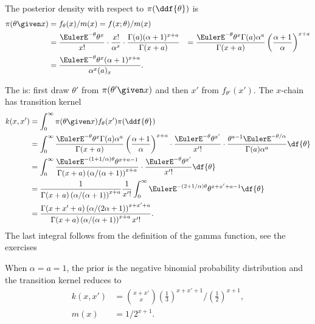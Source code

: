 \documentclass[12pt]{article}
\begin{document}
The posterior density with respect to \( \pi(\ddf{\theta}) \) is
\begin{align*}
    \pi(\theta \given x) &= f_{\theta}(x)/m(x) = f(x; \theta)/m(x)\\
    &= \frac{\EulerE^{-\theta} \theta^x}{x!} \cdot \frac{x!}{\alpha^x}
    \cdot \frac{\Gamma(a) (\alpha + 1)^{x+a}}{\Gamma(x+a)} &= \frac{\EulerE^
    {-\theta} \theta^x \Gamma(a) \alpha^{a}}{\Gamma(x+a)} \left( \frac{\alpha
    + 1}{\alpha} \right)^{x+a} \\
    &=\frac {\EulerE^{-\theta} \theta^x (\alpha+1)^{x+a}}{\alpha^x (a)_x}.
\end{align*}

The  is:  first draw \( \theta' \) from \( \pi(\theta'
\given x) \) and then \( x' \) from \( f_{\theta'}(x') \).  The \( x \)-chain
has transition kernel
\begin{align*}
    k(x,x') &= \int_0^{\infty} \pi(\theta \given x) f_{\theta}(x') \pi(\ddf
    {\theta}) \\
    &= \int_0^{\infty} \frac{\EulerE^{-\theta} \theta^x \Gamma(a) \alpha^
    {a}}{\Gamma(x+a)} \left( \frac{\alpha + 1}{\alpha} \right)^{x+a}
    \cdot \frac{\EulerE^{-\theta} \theta^{x'}}{x'!} \cdot \frac{\theta^{a-1}
    \EulerE^{-\theta/\alpha}}{\Gamma(a) \alpha^{a}} \df{\theta} \\
    &= \int_0^{\infty} \frac{\EulerE^{-(1 + 1/\alpha)\theta} \theta^{x +
    a - 1}}{\Gamma(x+a) \left( \alpha/(\alpha+1) \right)^{x+a}} \cdot
    \frac{\EulerE^{-\theta} \theta^{x'}}{x'!} \df{\theta} \\
    &= \frac{1}{\Gamma(x+a) \left( \alpha/(\alpha+1) \right)^{x+a}}
    \frac{1}{x'!} \int_0^{\infty} \EulerE^{-(2 + 1/\alpha)\theta} \theta^
    {x + x' + a - 1} \df{\theta} \\
    &= \frac{\Gamma(x+x'+a) \left( \alpha/(2\alpha+1)\right)^{x+x'+a}}{\Gamma
    (x+a) \left( \alpha/(\alpha+1)\right)^{x+a} x'!}.
\end{align*}
The last integral follows from the definition of the gamma function, see
the exercises

When \( \alpha = a = 1 \), the prior is the negative binomial
probability distribution%
and the transition kernel reduces to
\begin{align*}
    k(x,x') &= \binom{x+x'}{x} \left( \frac{1}{3} \right)^{x+x'+1} \Big/
    \left( \frac{1}{2} \right)^{x+1}, \\
    m(x) &= 1/2^{x+1}.
\end{align*}
\end{document}
